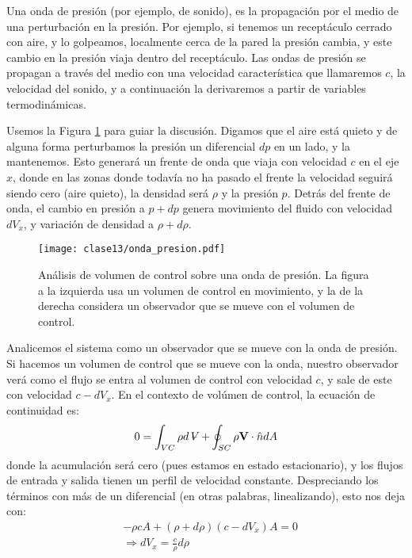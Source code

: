 Una onda de presión (por ejemplo, de sonido), es la propagación por el medio de una perturbación en la presión.
Por ejemplo, si tenemos un receptáculo cerrado con aire, y lo golpeamos, localmente cerca de la pared la presión cambia, y este cambio en la presión viaja dentro del receptáculo.
Las ondas de presión se propagan a través del medio con una velocidad característica que llamaremos $c$, la velocidad del sonido, y a continuación la derivaremos a partir de variables termodinámicas.

Usemos la Figura \ref{fig:onda_presion} para guiar la discusión.
Digamos que el aire está quieto y de alguna forma perturbamos la presión un diferencial $dp$ en un lado, y la mantenemos.
Esto generará un frente de onda que viaja con velocidad $c$ en el eje $x$, donde en las zonas donde todavía no ha pasado el frente la velocidad seguirá siendo cero (aire quieto), la densidad será $\rho$ y la presión $p$.
Detrás del frente de onda, el cambio en presión a $p+dp$ genera movimiento del fluido con velocidad $dV_x$, y variación de densidad a $\rho+d\rho$.
%
\begin{figure}
\centering
\texttt{[image: clase13/onda\_presion.pdf]}
\caption{Análisis de volumen de control sobre una onda de presión. La figura a la izquierda usa un volumen de control en movimiento, y la de la derecha considera un observador que se mueve con el volumen de control.}
\label{fig:onda_presion}
\end{figure}

Analicemos el sistema como un observador que se mueve con la onda de presión.
Si hacemos un volumen de control que se mueve con la onda, nuestro observador verá como el flujo se entra al volumen de control con velocidad $c$, y sale de este con velocidad $c-dV_x$.
En el contexto de volúmen de control, la ecuación de continuidad es:
%
\begin{equation}
0 = \int_{VC}\rho d\vol + \oint_{SC}\rho \mathbf{V}\cdot\hat{n}dA
\end{equation}
%
donde la acumulación será cero (pues estamos en estado estacionario), y los flujos de entrada y salida tienen un perfil de velocidad constante.
Despreciando los términos con más de un diferencial (en otras palabras, linealizando), esto nos deja con:
%
\begin{align}\label{eq:continuidad_onda}
&-\rho c A + (\rho+d\rho)(c-dV_x)A = 0\nonumber\\
&\Rightarrow dV_x = \frac{c}{\rho}d\rho
\end{align}

